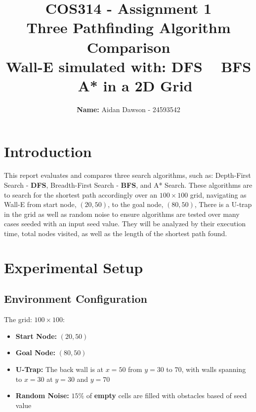 \documentclass[12pt,a4paper]{article}
\title{
    \vspace{1.5cm}
    \textbf{COS314 - Assignment 1} \\
    \vspace{0.5cm}
    \large Three Pathfinding Algorithm Comparison \\
    \vspace{0.5cm}
    \large Wall-E simulated with: DFS ~ BFS ~ A* in a 2D Grid \\
    \vspace{1.5cm}
}
\author{
    \textbf{Name:} Aidan Dawson - 24593542\\
}
\begin{document}
\maketitle
\newpage

\section{Introduction}

This report evaluates and compares three search algorithms, such as: 
Depth-First Search - \textbf{DFS}, Breadth-First Search - \textbf{BFS}, and A* Search.
These algorithms are to search for the shortest path accordingly over an $100 \times 100$ grid,
navigating as Wall-E from start node, $(20,50)$, to the goal node, $(80,50)$,
There is a U-trap in the grid as well as random noise to ensure algorithms are tested
over many cases seeded with an input seed value. They will be analyzed by their execution time, total nodes visited,
as well as the length of the shortest path found.

\section{Experimental Setup}

\subsection{Environment Configuration}
The grid:  $100 \times 100$:
\begin{itemize}
    \item \textbf{Start Node:} $(20, 50)$
    \item \textbf{Goal Node:} $(80, 50)$
    \item \textbf{U-Trap:} The back wall is at $x=50$ from $y=30$ to $70$, with walls spanning to $x=30$ at $y=30$ and $y=70$
    \item \textbf{Random Noise:} $15\%$ of \textbf{empty} cells are filled with obstacles based of seed value
\end{itemize}
\end{document}

